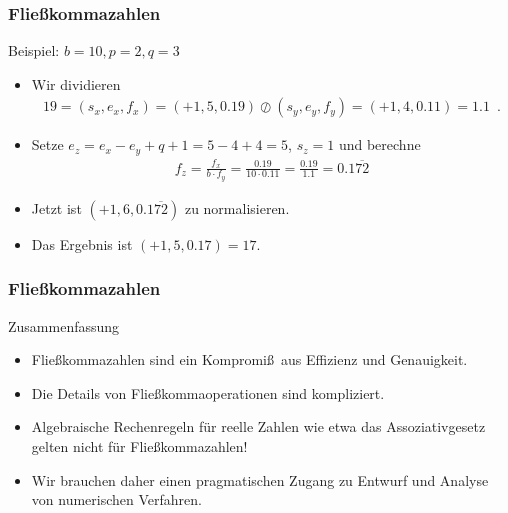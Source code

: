 \documentclass{beamer}
\newcommand{\ue}{\"u}
\newcommand{\mytitle}{Flie\ss kommazahlen}
\begin{document}
\begin{frame}\frametitle{\mytitle}
	\begin{block}{Beispiel: $b=10,p=2,q=3$}
		\begin{itemize}
			\item Wir dividieren
				\begin{align*}
					19=(s_x,e_x,f_x)=(+1,5,0.19)\oslash(s_y,e_y,f_y)=(+1,4,0.11)=1.1\enspace.
				\end{align*}
			\item Setze $e_z=e_x-e_y+q+1=5-4+4=5$, $s_z=1$ und berechne
				\begin{align*}
					f_z= \frac{f_x}{b\cdot f_y}=\frac{0.19}{10\cdot0.11}=\frac{0.19}{1.1}=0.1\overline{72}
				\end{align*}
			\item Jetzt ist $(+1,6,0.1\overline{72})$ zu normalisieren.
			\item Das Ergebnis ist $(+1,5,0.17)=17$.
		\end{itemize}
	\end{block}
\end{frame}

\begin{frame}\frametitle{\mytitle}
	\begin{block}{Zusammenfassung}
		\begin{itemize}
			\item Flie\ss kommazahlen sind ein Kompromi\ss\ aus Effizienz und Genauigkeit.
			\item Die Details von Flie\ss kommaoperationen sind kompliziert.
			\item Algebraische Rechenregeln f\ue r reelle Zahlen wie etwa das Assoziativgesetz gelten \alert{nicht} f\ue r Flie\ss kommazahlen!
			\item Wir brauchen daher einen pragmatischen Zugang zu Entwurf und Analyse von numerischen Verfahren.
		\end{itemize}
	\end{block}
\end{frame}
\end{document}
